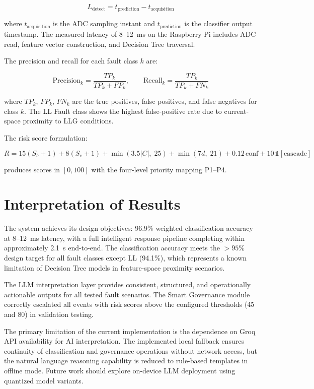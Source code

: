 \begin{equation}
L_{\text{detect}} = t_{\text{prediction}} - t_{\text{acquisition}}
\end{equation}

where $t_{\text{acquisition}}$ is the ADC sampling instant and $t_{\text{prediction}}$ is the classifier output timestamp. The measured latency of 8--12~ms on the Raspberry Pi includes ADC read, feature vector construction, and Decision Tree traversal.

The precision and recall for each fault class $k$ are:

\begin{equation}
\text{Precision}_k = \frac{TP_k}{TP_k + FP_k}, \qquad
\text{Recall}_k = \frac{TP_k}{TP_k + FN_k}
\end{equation}

where $TP_k$, $FP_k$, $FN_k$ are the true positives, false positives, and false negatives for class $k$. The LL Fault class shows the highest false-positive rate due to current-space proximity to LLG conditions.

The risk score formulation:

\begin{equation}
R = 15(S_b+1) + 8(S_e+1) + \min(3.5|C|,\;25) + \min(7d,\;21) + 0.12\,\text{conf} + 10\,\mathbb{1}[\text{cascade}]
\end{equation}

produces scores in $[0, 100]$ with the four-level priority mapping P1--P4.

\section{Interpretation of Results}

The system achieves its design objectives: 96.9\% weighted classification accuracy at 8--12~ms latency, with a full intelligent response pipeline completing within approximately 2.1~s end-to-end. The classification accuracy meets the $>95\%$ design target for all fault classes except LL (94.1\%), which represents a known limitation of Decision Tree models in feature-space proximity scenarios.

The LLM interpretation layer provides consistent, structured, and operationally actionable outputs for all tested fault scenarios. The Smart Governance module correctly escalated all events with risk scores above the configured thresholds (45 and 80) in validation testing.

The primary limitation of the current implementation is the dependence on Groq API availability for AI interpretation. The implemented local fallback ensures continuity of classification and governance operations without network access, but the natural language reasoning capability is reduced to rule-based templates in offline mode. Future work should explore on-device LLM deployment using quantized model variants.
